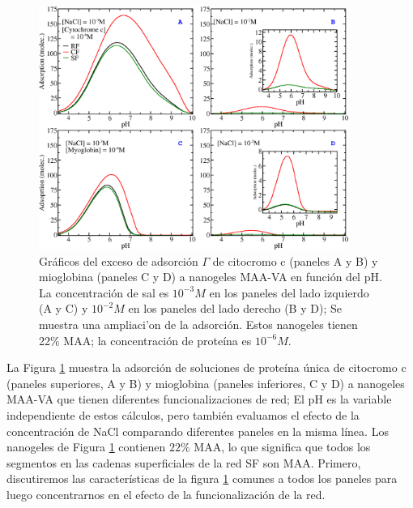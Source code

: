 \begin{figure}[!htb]
\includegraphics[width=0.9\textwidth]{Figures/graphs-gel2/abcd.png}
\caption{Gr\'aficos del exceso de adsorci\'on $\Gamma$ de citocromo c (paneles A y B) y mioglobina (paneles C y D) a nanogeles MAA-VA en funci\'on del pH.
	La concentraci\'on de sal es $10^{-3}M$ en los paneles del lado izquierdo (A y C) y $10^{-2}M$ en los paneles del lado derecho
	(B y D); Se muestra una ampliaci'on de la adsorci\'on.
	Estos nanogeles tienen 22\% MAA; la concentraci\'on de prote\'ina es $10^{-6}M$.}
\label{fig:esf:adsorption-vs-pH-cyto-myo}
\end{figure}



 
 La Figura \ref{fig:esf:adsorption-vs-pH-cyto-myo} muestra la adsorci\'on de soluciones de prote\'ina \'unica de citocromo c (paneles superiores, A y B) y mioglobina (paneles inferiores, C y D) a nanogeles MAA-VA que tienen diferentes funcionalizaciones de red;
 El pH es la variable independiente de estos c\'alculos, pero tambi\'en evaluamos el efecto de la concentraci\'on de NaCl comparando diferentes paneles en la misma l\'inea.
 Los nanogeles de Figura \ref{fig:esf:adsorption-vs-pH-cyto-myo} contienen $22\%$ MAA, lo que significa que todos los segmentos en las cadenas superficiales de la red SF son MAA.
 Primero, discutiremos las caracter\'isticas de la figura \ref{fig:esf:adsorption-vs-pH-cyto-myo} comunes a todos los paneles para luego concentrarnos en el efecto de la funcionalizaci\'on de la red.
 
 
 
